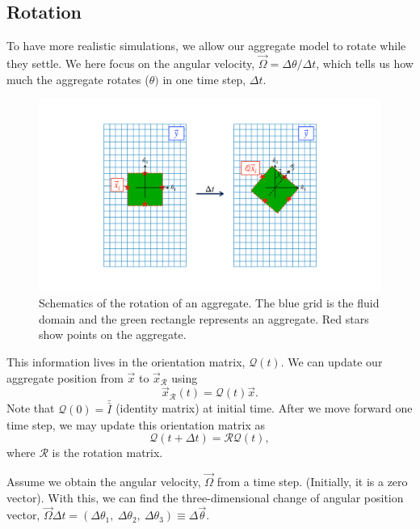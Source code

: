 \subsection{Rotation}
To have more realistic simulations, we allow our aggregate model to rotate while they settle.
We here focus on the angular velocity, $\vec{\Omega} = \Delta \theta / \Delta t$, which tells us how much the aggregate rotates ($\theta)$ in one time step, $\Delta t$. 
\begin{figure}[ht]
	\begin{center}
		\includegraphics[scale=0.25]{./figures/fig_rotation_schematics.pdf}
	\caption{Schematics of the rotation of an aggregate. The blue grid is the fluid domain and the green rectangle represents an aggregate. Red stars show points on the aggregate.}
	\label{fig_rotation_schematics}
\end{center}
\end{figure}
This information lives in the orientation matrix, $\mathcal{Q}(t)$. We can update our aggregate position from $\vec{x}$ to $\vec{x}_{\mathcal{R}}$ using
\[
\vec{x}_{\mathcal{R}}(t) = \mathcal{Q}(t) \vec{x}.
\]
Note that $\mathcal{Q}(0) = \bar{\bar{I}}$ (identity matrix) at initial time. After we move forward one time step, we may update this orientation matrix as 
\begin{equation}
	\mathcal{Q}(t + \Delta t) = \mathcal{R} \mathcal{Q}(t),
\end{equation} 
where $\mathcal{R}$ is the rotation matrix. 
\par
Assume we obtain the angular velocity, $\vec{\Omega}$ from a time step. (Initially, it is a zero vector). With this, we can find the three-dimensional change of angular position vector, $ \vec{\Omega} \Delta t = \left( \Delta \theta_1, \ \Delta \theta_2, \ \Delta \theta_3 \right) \equiv \Delta \vec{\theta}$.
